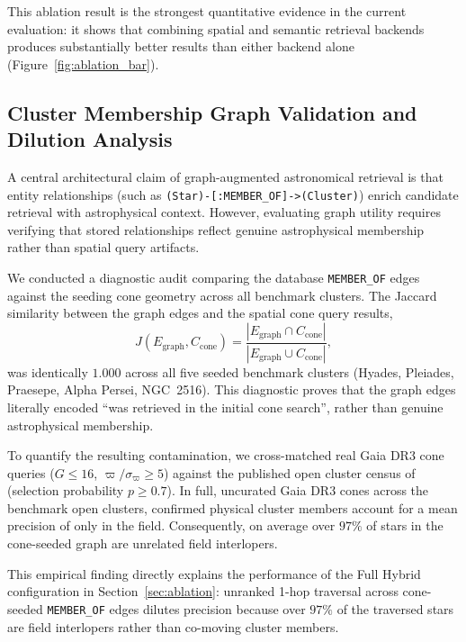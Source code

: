 \documentclass[preprint,12pt,authoryear]{elsarticle}
\begin{document}
This ablation result is the strongest quantitative evidence in the current evaluation: it shows that combining spatial and semantic retrieval backends produces substantially better results than either backend alone (Figure~\ref{fig:ablation_bar}).

\subsection{Cluster Membership Graph Validation and Dilution Analysis}
\label{sec:membership_eval}

A central architectural claim of graph-augmented astronomical retrieval is that entity relationships (such as \texttt{(Star)-[:MEMBER\_OF]->(Cluster)}) enrich candidate retrieval with astrophysical context. However, evaluating graph utility requires verifying that stored relationships reflect genuine astrophysical membership rather than spatial query artifacts.

We conducted a diagnostic audit comparing the database \texttt{MEMBER\_OF} edges against the seeding cone geometry across all benchmark clusters. The Jaccard similarity between the graph edges and the spatial cone query results,
\begin{equation}
J(E_{\mathrm{graph}}, C_{\mathrm{cone}}) = \frac{|E_{\mathrm{graph}} \cap C_{\mathrm{cone}}|}{|E_{\mathrm{graph}} \cup C_{\mathrm{cone}}|},
\end{equation}
was identically $1.000$ across all five seeded benchmark clusters (Hyades, Pleiades, Praesepe, Alpha Persei, NGC~2516). This diagnostic proves that the graph edges literally encoded ``was retrieved in the initial cone search'', rather than genuine astrophysical membership.

To quantify the resulting contamination, we cross-matched real Gaia DR3 cone queries ($G \le 16$, $\varpi / \sigma_\varpi \ge 5$) against the published open cluster census of \citet{Hunt2023} (selection probability $p \ge 0.7$). In full, uncurated Gaia DR3 cones across the \nMembClusters{} benchmark open clusters, confirmed physical cluster members account for a mean precision of only \edgesPrecision{} in the field. Consequently, on average over $97\%$ of stars in the cone-seeded graph are unrelated field interlopers.

This empirical finding directly explains the performance of the Full Hybrid configuration in Section~\ref{sec:ablation}: unranked 1-hop traversal across cone-seeded \texttt{MEMBER\_OF} edges dilutes precision because over $97\%$ of the traversed stars are field interlopers rather than co-moving cluster members.
\end{document}
